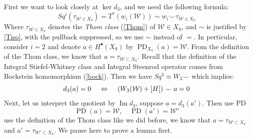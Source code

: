 \documentclass[a4paper,11pt]{article}
\theoremstyle{definition}
\theoremstyle{remark}
\begin{document}
First we want to look closely at $\ker d_3$, and we need the following formula: \cite[\S 8]{milnor1974characteristic}
\begin{equation}
	\label{eq:thom}
	Sq^i(\tau_{\mathcal{W}\in X_9})=T^*(w_i(\mathcal{W}))\sim w_i\smile \tau_{\mathcal{W}\in X_9}
\end{equation}
Where $\tau_{\mathcal{W}\in X_9}$ denotes the{ \itshape{Thom class}} (\cref{Thom}) of $\mathcal{W}\in X_9$, and $\sim$ is justified by \eqref{Tiso}, with the pullback suppressed, so we use $\sim$ instead of $=$. In perticular, consider $i=2$ and denote $a\in H^{\bullet}(X_9)$ by $\operatorname{PD}_{X_9}(a)=\mathcal{W}$. From the definition of the Thom class, we know that $a=\tau_{\mathcal{W}\subset X_9}$. Recall that the definition of the Integral Stiefel-Whitney class and Integral Steenrod operator comes from Bockstein homomorphism (\cref{bock}). Then we have $Sq^3\approx W_3\smile$ which implies:
\[
\large d_3(a)=0\quad\Leftrightarrow\quad\left(W_3(\mathcal{W})+[H]\right)\smile a=0
\]
Next, let us interpret the quotient by $\operatorname{Im}d_3$, suppose $a=d_3(a')$. Then use PD
\[
\operatorname{PD}(a)=\mathcal{W},\quad \operatorname{PD}(a')=\mathcal{W}'
\]
use the definition of the Thom class like we did before, we know that $a=\tau_{\mathcal{W}\subset X_9}$ and $a'=\tau_{\mathcal{W}'\subset X_9}$. We pause here to prove a lemma first.
\end{document}
